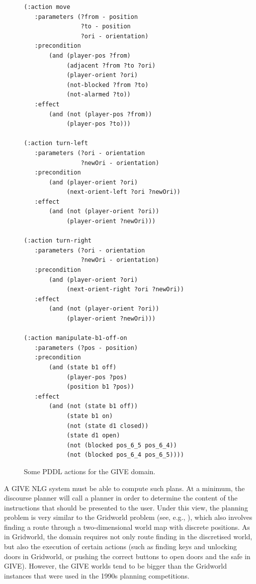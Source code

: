 \begin{figure}
\centering
\begin{minipage}{0.5\textwidth}
{\small%
\begin{verbatim}
(:action move
   :parameters (?from - position
                ?to - position
                ?ori - orientation)
   :precondition 
       (and (player-pos ?from) 
            (adjacent ?from ?to ?ori) 
            (player-orient ?ori)
            (not-blocked ?from ?to)
            (not-alarmed ?to))
   :effect 
       (and (not (player-pos ?from))
            (player-pos ?to)))

(:action turn-left
   :parameters (?ori - orientation
                ?newOri - orientation)
   :precondition 
       (and (player-orient ?ori)
            (next-orient-left ?ori ?newOri))
   :effect 
       (and (not (player-orient ?ori))
            (player-orient ?newOri)))

(:action turn-right
   :parameters (?ori - orientation
                ?newOri - orientation)
   :precondition 
       (and (player-orient ?ori)
            (next-orient-right ?ori ?newOri))
   :effect 
       (and (not (player-orient ?ori))
            (player-orient ?newOri)))

(:action manipulate-b1-off-on
   :parameters (?pos - position)
   :precondition 
       (and (state b1 off)
            (player-pos ?pos)
            (position b1 ?pos))
   :effect 
       (and (not (state b1 off))
            (state b1 on)
            (not (state d1 closed))
            (state d1 open) 
            (not (blocked pos_6_5 pos_6_4))
            (not (blocked pos_6_4 pos_6_5))))
\end{verbatim}}%
\end{minipage}
\caption{Some PDDL actions for the GIVE domain.}
\label{fig:give-planning}
\end{figure}

A GIVE NLG system must be able to compute such plans. At a minimum,
the discourse planner will call a planner in order to determine the
content of the instructions that should be presented to the
user. Under this view, the planning problem is very similar to the
Gridworld problem (see, e.g., \citealt{Tovey-Koenig:2000}), which also
involves finding a route through a two-dimensional world map with
discrete positions. As in Gridworld, the domain requires not only
route finding in the discretised world, but also the execution of
certain actions (such as finding keys and unlocking doors in
Gridworld, or pushing the correct buttons to open doors and the safe
in GIVE). However, the GIVE worlds tend to be bigger than the
Gridworld instances that were used in the 1990s planning competitions.


